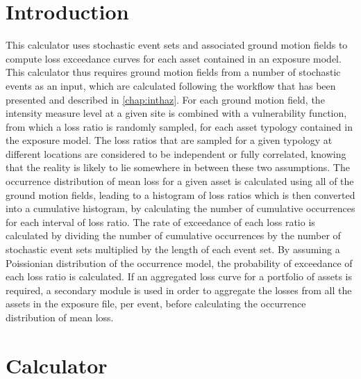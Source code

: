 \section{Introduction}
This calculator uses stochastic event sets and associated ground motion fields to compute loss exceedance curves for each asset contained in an exposure model. This calculator thus requires ground motion fields from a number of stochastic events as an input, which are calculated following the workflow that has been presented and described in \ref{chap:inthaz}. For each ground motion field, the intensity measure level at a given site is combined with a vulnerability function, from which a loss ratio is randomly sampled, for each asset typology contained in the exposure model. The loss ratios that are sampled for a given typology at different locations are considered to be independent or fully correlated, knowing that the reality is likely to lie somewhere in between these two assumptions. The occurrence distribution of mean loss for a given asset is calculated using all of the ground motion fields, leading to a histogram of loss ratios which is then converted into a cumulative histogram, by calculating the number of cumulative occurrences for each interval of loss ratio. The rate of exceedance of each loss ratio is calculated by dividing the number of cumulative occurrences by the number of stochastic event sets multiplied by the length of each event set. By assuming a Poissionian distribution of the occurrence model, the probability of exceedance of each loss ratio is calculated. If an aggregated loss curve for a portfolio of assets is required, a secondary module is used in order to aggregate the losses from all the assets in the exposure file, per event, before calculating the occurrence distribution of mean loss. 

\section{Calculator}

